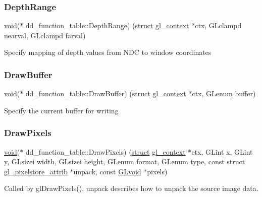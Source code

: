 \subsubsection{\texorpdfstring{Depth\+Range}{DepthRange}}
{\footnotesize\ttfamily \hyperlink{interfacevoid}{void}($\ast$ dd\+\_\+function\+\_\+table\+::\+Depth\+Range) (\hyperlink{interfacestruct}{struct} \hyperlink{structgl__context}{gl\+\_\+context} $\ast$ctx, G\+Lclampd nearval, G\+Lclampd farval)}

Specify mapping of depth values from N\+DC to window coordinates \mbox{\label{structdd__function__table_abb75f45b604b66c6e6cf986383f17c1b}} 
\subsubsection{\texorpdfstring{Draw\+Buffer}{DrawBuffer}}
{\footnotesize\ttfamily \hyperlink{interfacevoid}{void}($\ast$ dd\+\_\+function\+\_\+table\+::\+Draw\+Buffer) (\hyperlink{interfacestruct}{struct} \hyperlink{structgl__context}{gl\+\_\+context} $\ast$ctx, \hyperlink{interfacevoid}{G\+Lenum} buffer)}

Specify the current buffer for writing \mbox{\label{structdd__function__table_a1970141fc8c558da3b315002a6157da3}} 
\subsubsection{\texorpdfstring{Draw\+Pixels}{DrawPixels}}
{\footnotesize\ttfamily \hyperlink{interfacevoid}{void}($\ast$ dd\+\_\+function\+\_\+table\+::\+Draw\+Pixels) (\hyperlink{interfacestruct}{struct} \hyperlink{structgl__context}{gl\+\_\+context} $\ast$ctx, G\+Lint x, G\+Lint y, G\+Lsizei width, G\+Lsizei height, \hyperlink{interfacevoid}{G\+Lenum} format, \hyperlink{interfacevoid}{G\+Lenum} type, const \hyperlink{interfacestruct}{struct} \hyperlink{structgl__pixelstore__attrib}{gl\+\_\+pixelstore\+\_\+attrib} $\ast$unpack, const \hyperlink{interfacevoid}{G\+Lvoid} $\ast$pixels)}

Called by gl\+Draw\+Pixels(). {\ttfamily unpack} describes how to unpack the source image data. \mbox{\label{structdd__function__table_ae22e641c2c7458248f00b64a289c2655}} 
